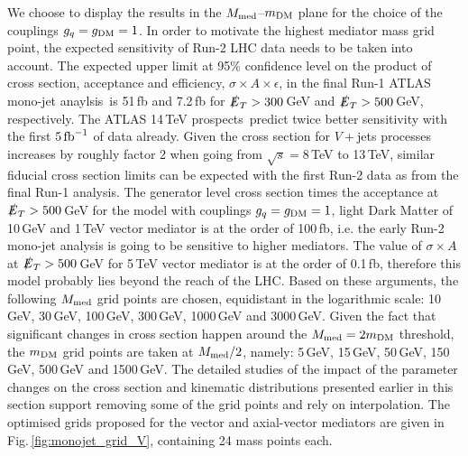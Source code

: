 We choose to display the results in the $M_{\rm{med}}$--$m_{\rm{DM}}$ plane for the choice of the couplings $g_q=g_{\rm{DM}}=1$. In order to motivate the highest mediator mass grid point, the expected sensitivity of Run-2 LHC data needs to be taken into account.
The expected upper limit at 95\% confidence level on the product of cross section, acceptance and efficiency, $\sigma\times A\times\epsilon$, in the final Run-1 ATLAS mono-jet anaylsis\,\cite{Aad:2015zva} is 51\,fb and 7.2\,fb  for $\slashed{E}_T>300$\,GeV and $\slashed{E}_T>500$\,GeV, respectively. The ATLAS 14\,TeV prospects\,\cite{ATL-PHYS-PUB-2014-007} predict twice better sensitivity with the first $5\,\rm{fb}^{-1}$ of data already. Given the cross section for $V+$jets processes increases by roughly factor 2 %
when going from $\sqrt{s}=8$\,TeV to 13\,TeV, similar fiducial cross section limits can be expected with the first Run-2 data as from the final Run-1 analysis.
The generator level cross section times the acceptance at $\slashed{E}_T>500$\,GeV for the model with couplings $g_q=g_{\rm{DM}}=1$, light Dark Matter of 10\,GeV and 1\,TeV vector mediator is at the order of 100\,fb, i.e. the early Run-2 mono-jet analysis is going to be sensitive to higher mediators. The value of $\sigma\times A$ at $\slashed{E}_T>500$\,GeV for 5\,TeV vector mediator is at the order of 0.1\,fb, therefore this model probably lies beyond the reach of the LHC.
Based on these arguments, the following $M_{\rm{med}}$ grid points are chosen, equidistant in the logarithmic scale: 10\,GeV, 30\,GeV, 100\,GeV, 300\,GeV, 1000\,GeV and 3000\,GeV. Given the fact that significant changes in cross section happen around the $M_{\rm{med}}=2m_{\rm{DM}}$ threshold, the $m_{\rm{DM}}$ grid points are taken at $M_{\rm{med}}/2$, namely: 5\,GeV, 15\,GeV, 50\,GeV, 150\,GeV, 500\,GeV and 1500\,GeV.
The detailed studies of the impact of the parameter changes on the cross section and kinematic distributions presented earlier in this section support removing some of the grid points and rely on interpolation. The optimised grids proposed for the vector and axial-vector mediators are given in Fig.\,\ref{fig:monojet_grid_V}, containing 24 mass points each.

